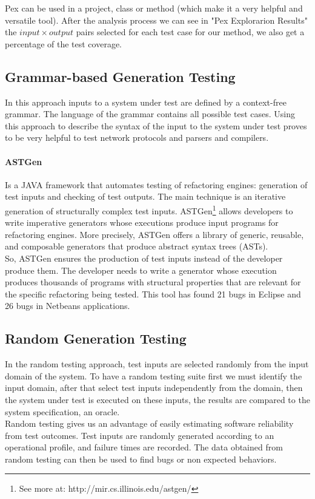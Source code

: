 \documentclass{llncs}
\begin{document}
Pex can be used in a project, class or method (which make it a very helpful and versatile tool). After the analysis process we can see in "Pex Explorarion Results"
the $input \times output$ pairs selected for each test case for our method, we also get a percentage of the test coverage.

\subsection{Grammar-based Generation Testing}
In this approach inputs to a system under test are defined by a context-free grammar. The language of the grammar contains all possible test cases.
Using this approach to describe the syntax of the input to the system under test proves to be very helpful to test
network protocols\cite{tal:syntax-based,kaksonen2001functional} and parsers and compilers\cite{1994-burgess,Burgess_Saidi_1996}.

\paragraph{\textbf{ASTGen}\cite{Daniel:2007:ATR:1287624.1287651}} Is a JAVA framework that automates testing of refactoring engines: generation of test inputs
and checking of test outputs. The main technique is an iterative generation of structurally complex test inputs.
ASTGen\footnote{See more at: http://mir.cs.illinois.edu/astgen/} allows developers to write imperative generators whose executions
produce input programs for refactoring engines. More precisely, ASTGen
offers a library of generic, reusable, and composable generators that produce abstract syntax trees (ASTs).\\
So, ASTGen ensures the production of test inputs instead of the developer produce them. The developer needs to write a generator whose execution
produces thousands of programs with structural properties that are relevant for the specific refactoring being tested. This tool has found
21 bugs in Eclipse and 26 bugs in Netbeans applications.

\subsection{Random Generation Testing}
In the random testing approach, test inputs are selected randomly from the input domain of the system.
To have a random testing suite first we must identify the input domain, after that select test inputs independently from the domain,
then the system under test is executed on these inputs, the results are compared to the system specification, an oracle.\\
Random testing gives us an advantage of easily estimating software reliability from test outcomes.
Test inputs are randomly generated according to an operational profile, and failure times are recorded.
The data obtained from random testing can then be used to find bugs or non expected behaviors.\\
\end{document}
